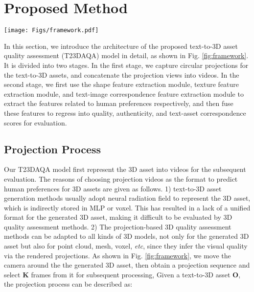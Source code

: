 \section{Proposed Method}

\begin{figure*}[t]
    \centering
    \texttt{[image: Figs/framework.pdf]}
    \caption{Illustration of our proposed T23DAQA method, which is divided into two stages. In the first stage, circular projection views are captured from the text-to-3D generated assets and then concatenated to form a video sequence. In the second stage, three distinct modules are employed to extract shape features, texture features, and text-image alignment features, respectively. Then these features are fused together to regress into quality, authenticity, and text-asset correspondence scores for comprehensive evaluation.}
    \label{fig:framework}
    \vspace{-0.5cm}
\end{figure*}

In this section, we introduce the architecture of the proposed text-to-3D asset quality assessment (T23DAQA) model in detail, as shown in Fig. \ref{fig:framework}. It is divided into two stages. In the first stage, we capture circular projections for the text-to-3D assets, and concatenate the projection views into videos. In the second stage, we first use the shape feature extraction module, texture feature extraction module, and text-image correspondence feature extraction module to extract the features related to human preferences respectively, and then fuse these features to regress into quality, authenticity, and text-asset correspondence scores for evaluation.
\vspace{-15pt}
\subsection{Projection Process}
                            Our T23DAQA model first represent the 3D asset into videos for the subsequent evaluation.
                            The reasons of choosing projection videos as the format to predict human preferences for 3D assets are given as follows. 1) text-to-3D asset generation methods usually adopt neural radiation field to represent the 3D asset, which is indirectly stored in MLP or voxel. This has resulted in a lack of a unified format for the generated 3D asset, making it difficult to be evaluated by 3D quality assessment methods. 2) The projection-based 3D quality assessment methods can be adapted to all kinds of 3D models, not only for the generated 3D asset but also for point cloud, mesh, voxel, \textit{etc}, since they infer the visual quality via the rendered projections. As shown in Fig. \ref{fig:framework}, we move the camera around the the generated 3D asset, then obtain a projection sequence and select $\mathbf{K}$ frames from it for subsequent processing, Given a text-to-3D asset $\mathbf{O}$, the projection process can be described as:


